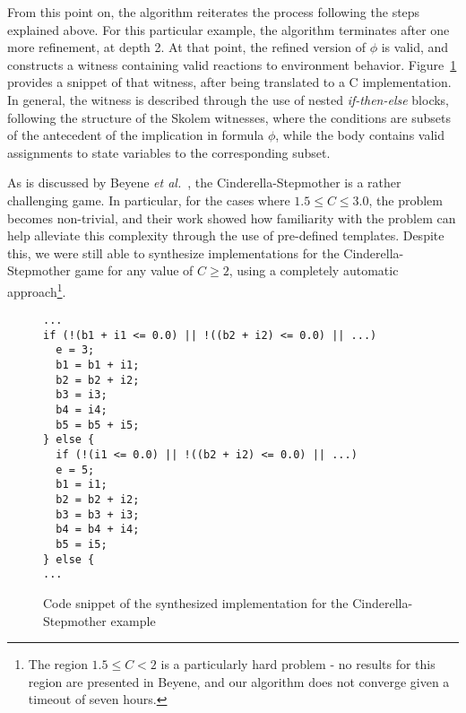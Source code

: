 From this point on, the algorithm reiterates the process following the steps
explained above. For this particular example, the algorithm terminates after one
more refinement, at depth 2. At that point, the refined version of
$\phi$ is valid, and \aeval constructs a witness containing valid reactions to
environment behavior. Figure~\ref{fg:witness} provides a snippet of
that witness, after being translated to a C implementation.
In general, the witness is described through the use of nested \textit{if-then-else} blocks, following the structure of the Skolem witnesses, where the conditions are subsets of the antecedent of
the implication in formula $\phi$, while the body contains valid assignments to
state variables to the corresponding subset.


As is discussed by Beyene \textit{et al.}~\cite{beyene2014constraint}, the
Cinderella-Stepmother is a rather challenging game. In particular, for the
cases where $1.5 \leq C \leq 3.0$, the problem becomes non-trivial, and their
work showed how familiarity with the problem can help alleviate this complexity
through the use of pre-defined templates. Despite this, we were still
able to synthesize implementations for the Cinderella-Stepmother game for any
value of $C \geq 2$, using a completely automatic approach\footnote{The region $1.5\leq C < 2$ is a particularly hard problem - no results for this region are presented in Beyene, and our algorithm does not converge given a timeout of seven hours.}. %

\begin{figure}[!t]
\centering
 \begin{Verbatim}[fontsize=\footnotesize]
...
if (!(b1 + i1 <= 0.0) || !((b2 + i2) <= 0.0) || ...)
  e = 3;
  b1 = b1 + i1;
  b2 = b2 + i2;
  b3 = i3;
  b4 = i4;
  b5 = b5 + i5;
} else {
  if (!(i1 <= 0.0) || !((b2 + i2) <= 0.0) || ...)
  e = 5;
  b1 = i1;
  b2 = b2 + i2;
  b3 = b3 + i3;
  b4 = b4 + i4;
  b5 = i5;
} else {
...
 \end{Verbatim}
\caption{Code snippet of the synthesized implementation for the Cinderella-Stepmother
example}
\label{fg:witness}
\end{figure}

